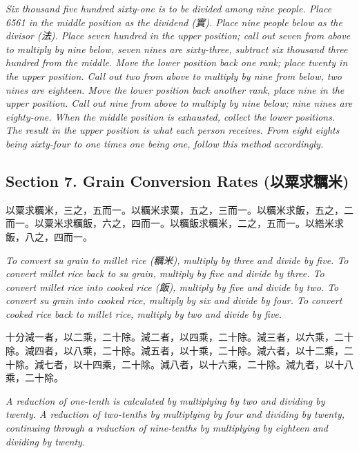 \documentclass[11pt,a4paper]{article}
\newcommand{\zh}[1]{{\CJKfamily{}#1}}
\begin{document}
\textit{Six thousand five hundred sixty-one is to be divided among nine people. Place 6561 in the middle position as the dividend (\zh{實}). Place nine people below as the divisor (\zh{法}). Place seven hundred in the upper position; call out seven from above to multiply by nine below, seven nines are sixty-three, subtract six thousand three hundred from the middle. Move the lower position back one rank; place twenty in the upper position. Call out two from above to multiply by nine from below, two nines are eighteen. Move the lower position back another rank, place nine in the upper position. Call out nine from above to multiply by nine below; nine nines are eighty-one. When the middle position is exhausted, collect the lower positions. The result in the upper position is what each person receives. From eight eights being sixty-four to one times one being one, follow this method accordingly.}

\subsection*{Section 7. Grain Conversion Rates (\zh{以粟求糲米})}

\begin{problembox}[title=\zh{以粟求糲米}]
\zh{以粟求糲米，三之，五而一。以糲米求粟，五之，三而一。以糲米求飯，五之，二而一。以粟米求糲飯，六之，四而一。以糲飯求糲米，二之，五而一。以綹米求飯，八之，四而一。}
\end{problembox}

\textit{To convert su grain to millet rice (\zh{糲米}), multiply by three and divide by five. To convert millet rice back to su grain, multiply by five and divide by three. To convert millet rice into cooked rice (\zh{飯}), multiply by five and divide by two. To convert su grain into cooked rice, multiply by six and divide by four. To convert cooked rice back to millet rice, multiply by two and divide by five.}

\vspace{0.3cm}

\begin{problembox}[title=\zh{十分減一者}]
\zh{十分減一者，以二乘，二十除。減二者，以四乘，二十除。減三者，以六乘，二十除。減四者，以八乘，二十除。減五者，以十乘，二十除。減六者，以十二乘，二十除。減七者，以十四乘，二十除。減八者，以十六乘，二十除。減九者，以十八乘，二十除。}
\end{problembox}

\textit{A reduction of one-tenth is calculated by multiplying by two and dividing by twenty. A reduction of two-tenths by multiplying by four and dividing by twenty, continuing through a reduction of nine-tenths by multiplying by eighteen and dividing by twenty.}
\end{document}
